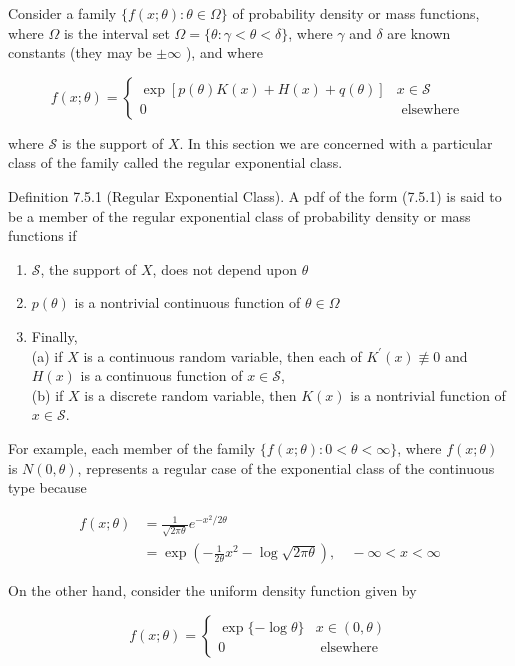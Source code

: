 Consider a family $\{f(x ; \theta): \theta \in \Omega\}$ of probability density or mass functions, where $\Omega$ is the interval set $\Omega=\{\theta: \gamma<\theta<\delta\}$, where $\gamma$ and $\delta$ are known constants (they may be $\pm \infty$ ), and where

\[
f(x ; \theta)= \begin{cases}\exp [p(\theta) K(x)+H(x)+q(\theta)] & x \in \mathcal{S}  \tag{7.5.1}\\ 0 & \text { elsewhere }\end{cases}
\]

where $\mathcal{S}$ is the support of $X$. In this section we are concerned with a particular class of the family called the regular exponential class.

Definition 7.5.1 (Regular Exponential Class). A pdf of the form (7.5.1) is said to be a member of the regular exponential class of probability density or mass functions if

\begin{enumerate}
  \item $\mathcal{S}$, the support of $X$, does not depend upon $\theta$
  \item $p(\theta)$ is a nontrivial continuous function of $\theta \in \Omega$
  \item Finally,\\
(a) if $X$ is a continuous random variable, then each of $K^{\prime}(x) \not \equiv 0$ and $H(x)$ is a continuous function of $x \in \mathcal{S}$,\\
(b) if $X$ is a discrete random variable, then $K(x)$ is a nontrivial function of $x \in \mathcal{S}$.
\end{enumerate}

For example, each member of the family $\{f(x ; \theta): 0<\theta<\infty\}$, where $f(x ; \theta)$ is $N(0, \theta)$, represents a regular case of the exponential class of the continuous type because

$$
\begin{aligned}
f(x ; \theta) & =\frac{1}{\sqrt{2 \pi \theta}} e^{-x^{2} / 2 \theta} \\
& =\exp \left(-\frac{1}{2 \theta} x^{2}-\log \sqrt{2 \pi \theta}\right), \quad-\infty<x<\infty
\end{aligned}
$$

On the other hand, consider the uniform density function given by

$$
f(x ; \theta)= \begin{cases}\exp \{-\log \theta\} & x \in(0, \theta) \\ 0 & \text { elsewhere }\end{cases}
$$

